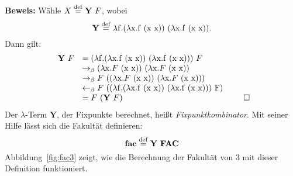 \noindent\textbf{Beweis:}  Wähle $X \stackrel{\rm def}{=}{} \mathbf{Y}~F$, wobei
  \begin{displaymath}
    \mathbf{Y} \stackrel{\rm def}{=}{} \lambda \mathrm f.(\lambda \mathrm x.\mathrm f~(\mathrm x~\mathrm x))~(\lambda \mathrm x.\mathrm f~(\mathrm x~\mathrm x)).
  \end{displaymath}
  Dann gilt:
  \begin{displaymath}
    \begin{array}[b]{rl}
      \mathbf{Y}~F & = (\lambda \mathrm f.(\lambda \mathrm x.\mathrm f~(\mathrm x~\mathrm x))~(\lambda \mathrm x.\mathrm f~(\mathrm x~\mathrm x)))~F
      \\ & \rightarrow_\beta
      (\lambda \mathrm x.F~(\mathrm x~\mathrm x))~(\lambda \mathrm x.F~(\mathrm x~\mathrm x))
      \\ & \rightarrow_\beta
      F~((\lambda \mathrm x.F~(\mathrm x~\mathrm x))~(\lambda \mathrm x.F~(\mathrm x~\mathrm x)))
      \\ & \leftarrow_\beta
      F~((\lambda \mathrm f.(\lambda \mathrm x.\mathrm f~(\mathrm x~\mathrm x))~(\lambda \mathrm x.\mathrm f~(\mathrm x~\mathrm x)))~\mathrm F)
      \\ & =
      F~(\mathbf{Y}~F)
    \end{array}\tag*{$\square$}
  \end{displaymath}
%
Der $\lambda$-Term $\mathbf{Y}$, der Fixpunkte
berechnet, heißt
\textit{Fixpunktkombinator}.  Mit seiner Hilfe lässt sich
die Fakultät definieren:
%
\begin{displaymath}
  \mathbf{fac} \stackrel{\rm def}{=}{} \mathbf{Y}~\mathbf{FAC}
\end{displaymath}
%
Abbildung~\ref{fig:fac3} zeigt, wie die Berechnung der Fakultät von
$3$ mit dieser Definition funktioniert.

